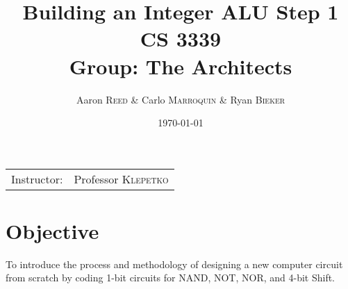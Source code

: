 \documentclass[
	letterpaper, %
	10pt, %
]{CSUniSchoolLabReport}
\title{Building an Integer ALU Step 1\\ CS 3339 \\ Group: The Architects} %
\author{Aaron \textsc{Reed} \& Carlo \textsc{Marroquin} \& Ryan \textsc{Bieker}} %
\date{\today} %
\begin{document}
\maketitle %

\begin{center}
	\begin{tabular}{l r}
		Instructor: & Professor \textsc{Klepetko} %
	\end{tabular}
\end{center}



\section{Objective}

To introduce the process and methodology of designing a new computer circuit from scratch by coding 1-bit circuits for NAND, NOT, NOR, and 4-bit Shift.



\end{document}
